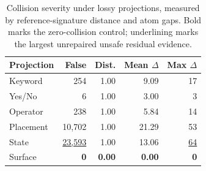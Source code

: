 \begin{table}[t]
\centering
\caption{Collision severity under lossy projections, measured by reference-signature distance and atom gaps. Bold marks the zero-collision control; underlining marks the largest unrepaired unsafe residual evidence.}
\label{tab:collision-severity}
\footnotesize
\setlength{\tabcolsep}{3pt}
\begin{tabular}{@{}lrrrr@{}}
\toprule
Projection & False & Dist. & Mean $\Delta$ & Max $\Delta$ \\
\midrule
Keyword & 254 & 1.00 & 9.09 & 17 \\
Yes/No & 6 & 1.00 & 3.00 & 3 \\
Operator & 238 & 1.00 & 5.84 & 14 \\
Placement & 10,702 & 1.00 & 21.29 & 53 \\
State & \underline{23,593} & 1.00 & 13.06 & \underline{64} \\
Surface & \textbf{0} & \textbf{0.00} & \textbf{0.00} & \textbf{0} \\
\bottomrule
\end{tabular}
\end{table}
